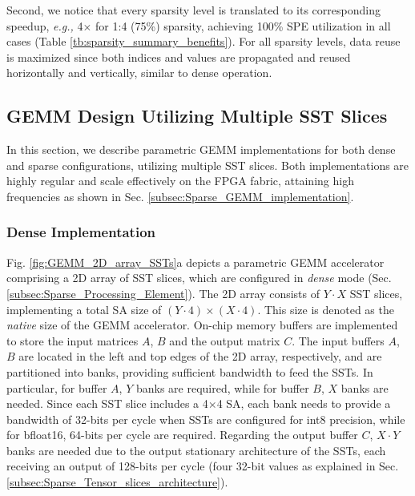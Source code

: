 Second, we notice that every sparsity level is
translated to its corresponding speedup, \emph{e.g.,} 4$\times$ for 1:4 (75\%) sparsity, achieving 100\% SPE utilization in all cases (Table \ref{tb:sparsity_summary_benefits}).
For all sparsity levels, data reuse is maximized since both indices and values are propagated and reused horizontally and vertically, similar to dense operation.






\subsection{GEMM Design Utilizing Multiple SST Slices}
\label{subsec:Matrix_multiplication_mapping}


In this section, we describe parametric GEMM implementations for both dense and sparse configurations, utilizing multiple SST slices.
Both implementations are highly regular and scale effectively on the FPGA fabric, attaining high frequencies as shown in Sec. \ref{subsec:Sparse_GEMM_implementation}.




\subsubsection{Dense Implementation}

Fig. \ref{fig:GEMM_2D_array_SSTs}a depicts a parametric GEMM accelerator comprising a 2D array of SST slices, which are configured in \textit{dense} mode (Sec. \ref{subsec:Sparse_Processing_Element}). 
The 2D array consists of $Y \cdot X$ SST slices, implementing a total SA size of $(Y \cdot 4) \times (X \cdot 4)$.
This size is denoted as the \textit{native} size of the GEMM accelerator. 
On-chip memory buffers are implemented to store the input matrices $A$, $B$ and the output matrix $C$.
The input buffers $A$, $B$ are located in the left and top edges of the 2D array, respectively, and are partitioned into banks, providing sufficient bandwidth to feed the SSTs.
In particular, for buffer $A$, $Y$ banks are required, while for buffer $B$, $X$ banks are needed.
Since each SST slice includes a 4$\times$4 SA, each bank needs to provide a bandwidth of 32-bits per cycle when SSTs are configured for int8 precision, while for bfloat16, 64-bits per cycle are required.
Regarding the output buffer $C$, $X \cdot Y$ banks are needed due to the output stationary architecture of the SSTs, each receiving an output of 128-bits per cycle (four 32-bit values as explained in Sec. \ref{subsec:Sparse_Tensor_slices_architecture}).
 



